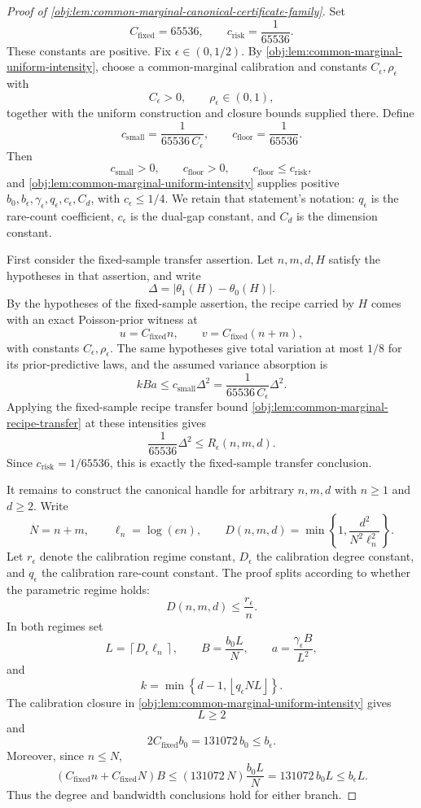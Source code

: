 \begin{proof}[Proof of \cref{obj:lem:common-marginal-canonical-certificate-family}]
Set
\[
C_{\mathrm{fixed}}=65536,
\qquad
c_{\mathrm{risk}}=\frac1{65536}.
\]
These constants are positive.  Fix \(\epsilon\in(0,1/2)\).  By \cref{obj:lem:common-marginal-uniform-intensity}, choose a common-marginal calibration and constants \(C_\epsilon,\rho_\epsilon\) with
\[
C_\epsilon>0,\qquad \rho_\epsilon\in(0,1),
\]
together with the uniform construction and closure bounds supplied there.  Define
\[
c_{\mathrm{small}}=\frac{1}{65536\,C_\epsilon},
\qquad
c_{\mathrm{floor}}=\frac1{65536}.
\]
Then
\[
c_{\mathrm{small}}>0,\qquad c_{\mathrm{floor}}>0,\qquad
c_{\mathrm{floor}}\le c_{\mathrm{risk}},
\]
and \cref{obj:lem:common-marginal-uniform-intensity} supplies positive
\(b_0,b_\epsilon,\gamma_\epsilon,q_\epsilon,c_\epsilon,C_d\), with
\(c_\epsilon\le 1/4\).  We retain that statement's notation: \(q_\epsilon\) is the
rare-count coefficient, \(c_\epsilon\) is the dual-gap constant, and \(C_d\) is
the dimension constant. %

First consider the fixed-sample transfer assertion.  Let \(n,m,d,H\) satisfy the hypotheses in that assertion, and write
\[
\Delta
=
\left|\theta_1(H)-\theta_0(H)\right|.
\]
By the hypotheses of the fixed-sample assertion, the recipe carried by \(H\) comes with an exact Poisson-prior witness at
\[
u=C_{\mathrm{fixed}}n,
\qquad
v=C_{\mathrm{fixed}}(n+m),
\]
with constants \(C_\epsilon,\rho_\epsilon\).  The same hypotheses give total variation at most \(1/8\) for its prior-predictive laws, and the assumed variance absorption is
\[
kBa\le c_{\mathrm{small}}\Delta^2
=
\frac{1}{65536\,C_\epsilon}\Delta^2 .
\]
Applying the fixed-sample recipe transfer bound \cref{obj:lem:common-marginal-recipe-transfer} at these intensities gives
\[
\frac1{65536}\Delta^2
\le
R_\epsilon(n,m,d).
\]
Since \(c_{\mathrm{risk}}=1/65536\), this is exactly the fixed-sample transfer conclusion. %

It remains to construct the canonical handle for arbitrary \(n,m,d\) with \(n\ge1\) and \(d\ge2\).  Write
\[
N=n+m,\qquad \ell_n=\log(en),
\qquad
D(n,m,d)=\min\left\{1,\frac{d^2}{N^2\ell_n^2}\right\}.
\]
Let \(r_\epsilon\) denote the calibration regime constant, \(D_\epsilon\) the calibration degree constant, and \(q_\epsilon\) the calibration rare-count constant.  The proof splits according to whether the parametric regime holds:
\[
D(n,m,d)\le \frac{r_\epsilon}{n}.
\]
In both regimes set
\[
L=\left\lceil D_\epsilon\ell_n\right\rceil,\qquad
B=\frac{b_0L}{N},\qquad
a=\frac{\gamma_\epsilon B}{L^2},
\]
and
\[
k=\min\left\{d-1,\left\lfloor q_\epsilon NL\right\rfloor\right\}.
\]
The calibration closure in \cref{obj:lem:common-marginal-uniform-intensity} gives
\[
L\ge2
\]
and
\[
2C_{\mathrm{fixed}}b_0=131072\,b_0\le b_\epsilon .
\]
Moreover, since \(n\le N\),
\[
(C_{\mathrm{fixed}}n+C_{\mathrm{fixed}}N)B
\le
(131072\,N)\frac{b_0L}{N}
=
131072\,b_0L
\le b_\epsilon L.
\]
Thus the degree and bandwidth conclusions hold for either branch. %


\end{proof}
